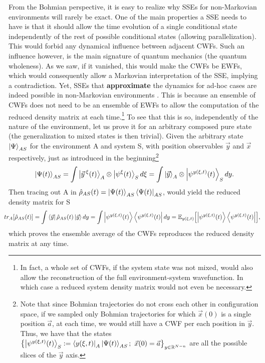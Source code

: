 \documentclass[11pt, a4paper]{article} %
\newcommand{\R}{\mathbb{R}} %
\begin{document}
From the Bohmian perspective, it is easy to realize why SSEs for non-Markovian environments will rarely be exact. One of the main properties a SSE needs to have is that it should allow the time evolution of a single conditional state independently of the rest of possible conditional states (allowing parallelization). This would forbid any dynamical influence between adjacent CWFs. Such an influence however, is the main signature of quantum mechanics (the quantum wholeness). As we saw, if it vanished, this would make the CWFs be EWFs, which would consequently allow a Markovian interpretation of the SSE, implying a contradiction. Yet, SSEs that {\bf approximate} the dynamics for ad-hoc cases are indeed possible in non-Markovian environments \cite{ Diosi, WisemanSSE, Thz}. This is because an ensemble of CWFs does not need to be an ensemble of EWFs to allow the computation of the reduced density matrix at each time.\footnote{In fact, a whole set of CWFs, if the system state was not mixed, would also allow the reconstruction of the full environment-system wavefunction. In which case a reduced system density matrix would not even be necessary.} To see that this is so, independently of the nature of the environment, let us prove it for an arbitrary composed pure state (the generalization to mixed states is then trivial). Given the arbitrary state $\ket{\Psi}_{AS}$ for the environment A and system S, with position observables $\vec{y}$ and $\vec{x}$ respectively, just as introduced in the beginning\footnote{Note that since Bohmian trajectories do not cross each other in configuration space, if we sampled only Bohmian trajectories for which $\vec{x}(0)$ is a single position $\vec{a}$, at each time, we would still have a CWF per each position in $\vec{y}$. Thus, we have that the states $\qty{\ket{\psi^{y(\xi,t)}(t)}_S:=\bra{y(\xi,t)}_A\ket{\Psi(t)}_{AS};\ \vec{x}(0)=\vec{a}}_{y\in\R^{N-n}}$ are all the possible slices of the $\vec{y}$ axis.}\vspace{-0.2cm}
\begin{equation}
\ket{\Psi(t)}_{AS}=\int\ket{\vec{y}^{\:\xi}(t)}_A\otimes \ket{\psi^\xi(t)}_S d\xi = \int\ket{\vec{y}}_A\otimes \ket{\psi^{y(\xi,t)}(t)}_S dy.
\end{equation}
Then tracing out A in $\hat{\rho}_{AS}(t)=\ket{\Psi(t)}_{AS}\bra{\Psi(t)}_{AS}$, would yield the reduced density matrix for S
\begin{equation}\hspace{-0.3cm}
tr_A\qty[\hat{\rho}_{AS}(t)] = \int\bra{\vec{y}}\hat{\rho}_{AS}(t)\ket{\vec{y}}dy = \int \ket{\psi^{y(\xi,t)}(t)}\bra{\psi^{y(\xi,t)}(t)} dy = \mathbb{E}_{y(\xi,t)}\qty[\ket{\psi^{y(\xi,t)}(t)}\bra{\psi^{y(\xi,t)}(t)}],
\end{equation}
which proves the ensemble average of the CWFs reproduces the reduced density matrix at any time.\vspace{-0.15cm}
\end{document}
